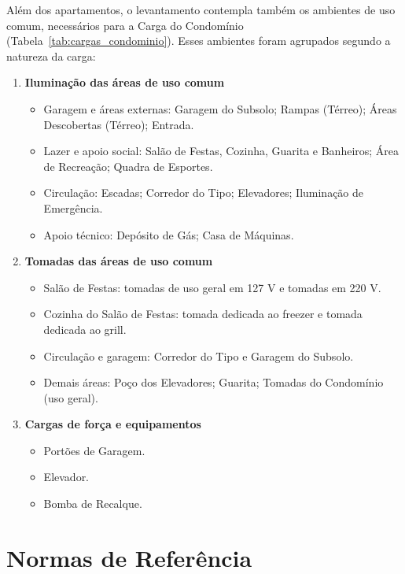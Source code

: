 \documentclass[12pt,openright,oneside,a4paper,brazil]{abntex2}
\begin{document}
Além dos apartamentos, o levantamento contempla também os ambientes de uso comum, necessários para a Carga do Condomínio (Tabela~\ref{tab:cargas_condominio}). Esses ambientes foram agrupados segundo a natureza da carga:

\begin{enumerate}[label=\alph*)]
    \item \textbf{Iluminação das áreas de uso comum}
    \begin{itemize}
        \item Garagem e áreas externas: Garagem do Subsolo; Rampas (Térreo); Áreas Descobertas (Térreo); Entrada.
        \item Lazer e apoio social: Salão de Festas, Cozinha, Guarita e Banheiros; Área de Recreação; Quadra de Esportes.
        \item Circulação: Escadas; Corredor do Tipo; Elevadores; Iluminação de Emergência.
        \item Apoio técnico: Depósito de Gás; Casa de Máquinas.
    \end{itemize}
    \item \textbf{Tomadas das áreas de uso comum}
        \begin{itemize}
            \item Salão de Festas: tomadas de uso geral em 127 V e tomadas em 220 V.
            \item Cozinha do Salão de Festas: tomada dedicada ao freezer e tomada dedicada ao grill.
            \item Circulação e garagem: Corredor do Tipo e Garagem do Subsolo.
            \item Demais áreas: Poço dos Elevadores; Guarita; Tomadas do Condomínio (uso geral).
        \end{itemize}
    \item \textbf{Cargas de força e equipamentos}
        \begin{itemize}
            \item Portões de Garagem.
            \item Elevador.
            \item Bomba de Recalque.
        \end{itemize}
\end{enumerate}



\section{Normas de Referência}
\end{document}
